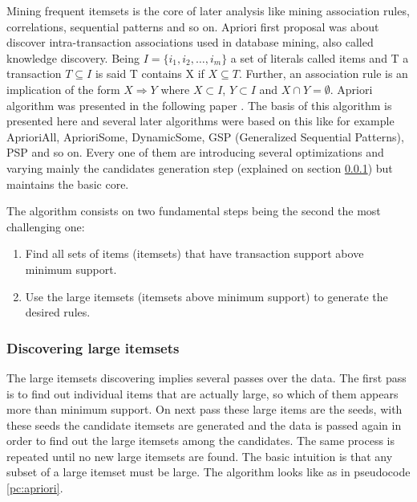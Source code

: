 Mining frequent itemsets is the core of later analysis like mining association
rules, correlations, sequential patterns and so on. Apriori first proposal was
about discover intra-transaction associations used
in database mining, also called knowledge discovery.
Being $I=\{i_{1}, i_{2}, \dots,i_{m}\}$ a set of literals called items and T a
transaction $T \subseteq I$ is said T contains X if $X \subseteq T$. Further, an
association rule is an implication of the form $X \Rightarrow Y$ where $X
\subset I$, $Y \subset I$ and $X \cap Y = \emptyset$. Apriori algorithm was
presented in the following paper \cite{agrawalfast}. The basis of this algorithm
is presented here and several later algorithms were based on this like for
example AprioriAll, AprioriSome, DynamicSome, GSP (Generalized Sequential
Patterns), PSP and so on. Every one of them are introducing several
optimizations and varying mainly the candidates generation step (explained on
section \ref{ss:discovering_large_itemsets}) but maintains 
the basic core.

The algorithm consists on two fundamental steps being the second the most
challenging one:
\begin{enumerate}
  \item Find all sets of items (itemsets) that have transaction support above
    minimum support.
  \item Use the large itemsets (itemsets above minimum support) to generate the
    desired rules.
\end{enumerate}

\subsubsection{Discovering large itemsets}\label{ss:discovering_large_itemsets}

The large itemsets discovering implies several passes over the data. The first
pass is to find out individual items that are actually large, so which of them
appears more than minimum support. 
On next pass these large items are the seeds, with these
seeds the candidate itemsets are generated and the data is passed again in order 
to find out the large itemsets among the candidates. The same process is repeated 
until no new large itemsets are found. The basic intuition is that any subset of
a large itemset must be large. The algorithm looks like as in pseudocode
\ref{pc:apriori}.

